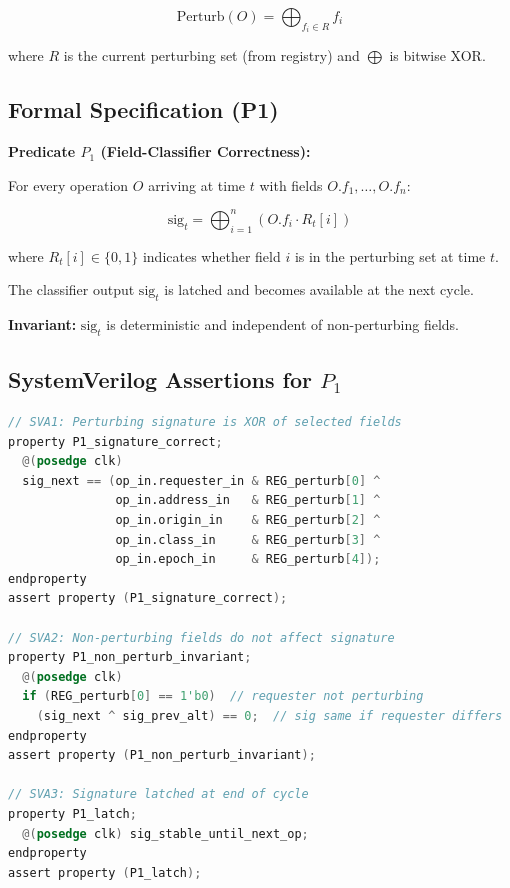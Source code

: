 \documentclass[11pt,oneside]{article}
\begin{document}
\[
\text{Perturb}(O) = \bigoplus_{f_i \in R} f_i
\]

where $R$ is the current perturbing set (from registry) and $\bigoplus$ is bitwise XOR.

\subsection{Formal Specification (P1)}

\begin{boxed}
\textbf{Predicate $P_1$ (Field-Classifier Correctness):}

For every operation $O$ arriving at time $t$ with fields $O.f_1, \ldots, O.f_n$:

\[
\text{sig}_t = \bigoplus_{i=1}^{n} (O.f_i \cdot R_t[i])
\]

where $R_t[i] \in \{0, 1\}$ indicates whether field $i$ is in the perturbing set at time $t$.

The classifier output $\text{sig}_t$ is latched and becomes available at the next cycle.

\textbf{Invariant:} $\text{sig}_t$ is deterministic and independent of non-perturbing fields.
\end{boxed}

\subsection{SystemVerilog Assertions for $P_1$}

\begin{lstlisting}[language=Verilog]
// SVA1: Perturbing signature is XOR of selected fields
property P1_signature_correct;
  @(posedge clk) 
  sig_next == (op_in.requester_in & REG_perturb[0] ^
               op_in.address_in   & REG_perturb[1] ^
               op_in.origin_in    & REG_perturb[2] ^
               op_in.class_in     & REG_perturb[3] ^
               op_in.epoch_in     & REG_perturb[4]);
endproperty
assert property (P1_signature_correct);

// SVA2: Non-perturbing fields do not affect signature
property P1_non_perturb_invariant;
  @(posedge clk)
  if (REG_perturb[0] == 1'b0)  // requester not perturbing
    (sig_next ^ sig_prev_alt) == 0;  // sig same if requester differs
endproperty
assert property (P1_non_perturb_invariant);

// SVA3: Signature latched at end of cycle
property P1_latch;
  @(posedge clk) sig_stable_until_next_op;
endproperty
assert property (P1_latch);
\end{lstlisting}
\end{document}
